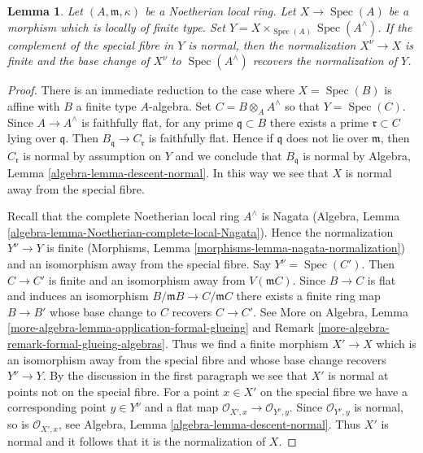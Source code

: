 \documentclass{stacks-project}
\theoremstyle{plain}
\newtheorem{lemma}[subsection]{Lemma}
\theoremstyle{definition}
\theoremstyle{remark}
\numberwithin{equation}{subsection}
\def\Spec{\mathop{\mathrm{Spec}}}
\begin{document}
\begin{lemma}
\label{lemma-normalization-completion}
Let $(A, \mathfrak m, \kappa)$ be a Noetherian local ring.
Let $X \to \Spec(A)$ be a morphism which is locally of finite type.
Set $Y = X \times_{\Spec(A)} \Spec(A^\wedge)$.
If the complement of the special fibre in $Y$ is normal, then
the normalization $X^\nu \to X$ is finite and the base change
of $X^\nu$ to $\Spec(A^\wedge)$ recovers the normalization of $Y$.
\end{lemma}

\begin{proof}
There is an immediate reduction to the case where $X = \Spec(B)$
is affine with $B$ a finite type $A$-algebra. Set $C = B \otimes_A A^\wedge$
so that $Y = \Spec(C)$. Since
$A \to A^\wedge$ is faithfully flat, for any prime $\mathfrak q \subset B$
there exists a prime $\mathfrak r \subset C$ lying over $\mathfrak q$.
Then $B_\mathfrak q \to C_\mathfrak r$ is faithfully flat. Hence if
$\mathfrak q$ does not lie over $\mathfrak m$, then $C_\mathfrak r$
is normal by assumption on $Y$ and we conclude that $B_\mathfrak q$
is normal by Algebra, Lemma \ref{algebra-lemma-descent-normal}.
In this way we see that $X$ is normal away from the special fibre.

\medskip\noindent
Recall that the complete Noetherian local ring $A^\wedge$ is Nagata
(Algebra, Lemma \ref{algebra-lemma-Noetherian-complete-local-Nagata}).
Hence the normalization $Y^\nu \to Y$ is finite
(Morphisms, Lemma \ref{morphisms-lemma-nagata-normalization})
and an isomorphism away from the special fibre. Say $Y^\nu = \Spec(C')$.
Then $C \to C'$ is finite and an isomorphism away from $V(\mathfrak m C)$.
Since $B \to C$ is flat and induces an isomorphism
$B/\mathfrak m B \to C/\mathfrak m C$ there exists a finite
ring map $B \to B'$ whose base change to $C$ recovers $C \to C'$.
See More on Algebra, Lemma
\ref{more-algebra-lemma-application-formal-glueing} and
Remark \ref{more-algebra-remark-formal-glueing-algebras}.
Thus we find a finite morphism $X' \to X$ which is an isomorphism
away from the special fibre and whose base change recovers $Y^\nu \to Y$.
By the discussion in the first paragraph we see that $X'$ is normal at
points not on the special fibre. For a point $x \in X'$ on the special
fibre we have a corresponding point $y \in Y^\nu$ and a flat map
$\mathcal{O}_{X', x} \to \mathcal{O}_{Y^\nu, y}$.
Since $\mathcal{O}_{Y^\nu, y}$ is normal, so is $\mathcal{O}_{X', x}$, see
Algebra, Lemma \ref{algebra-lemma-descent-normal}.
Thus $X'$ is normal and it follows that it is the normalization of $X$.
\end{proof}
\end{document}
